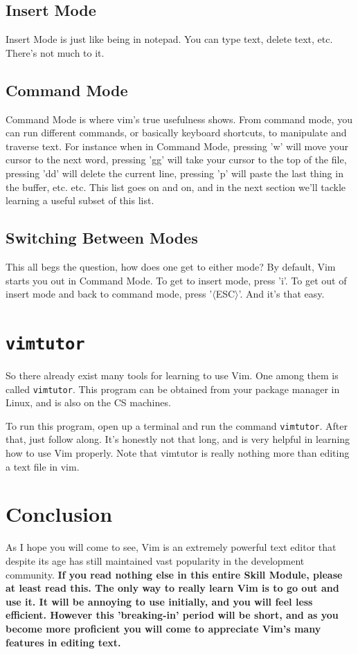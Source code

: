 \subsection{Insert Mode}
Insert Mode is just like being in notepad. You can type text, delete
text, etc. There's not much to it. 

\subsection{Command Mode}
Command Mode is where vim's true usefulness shows. From command mode, you can run
different commands, or basically keyboard shortcuts, to manipulate and traverse
text. For instance when in Command Mode, pressing 'w' will move your cursor
to the next word, pressing 'gg' will take your cursor to the top of the file,
pressing 'dd' will delete the current line, pressing 'p' will paste the last
thing in the buffer, etc. etc. This list goes on and on, and in the next section
we'll tackle learning a useful subset of this list.

\subsection{Switching Between Modes}
This all begs the question, how does one get to either mode? By default, Vim
starts you out in Command Mode. To get to insert mode, press 'i'. To get out of
insert mode and back to command mode, press '$\langle$ESC$\rangle$'. And it's that easy.

\section{\texttt{vimtutor}}
So there already exist many tools for learning to use Vim. One among them is called
\texttt{vimtutor}. This program can be obtained from your package manager in Linux,
and is also on the CS machines.

To run this program, open up a terminal and run the command \texttt{vimtutor}.
After that, just follow along. It's honestly not that long, and is very
helpful in learning how to use Vim properly. Note that vimtutor is really nothing
more than editing a text file in vim. 

\section{Conclusion}
As I hope you will come to see, Vim is an extremely powerful text editor that
despite its age has still maintained vast popularity in the development
community. {\bf If you read nothing else in this entire Skill Module, please
at least read this. The only way to really learn Vim is to go out and use it.
It will be annoying to use initially, and you will feel less efficient. However
this 'breaking-in' period will be short, and as you become more proficient
you will come to appreciate Vim's many features in editing text.}

